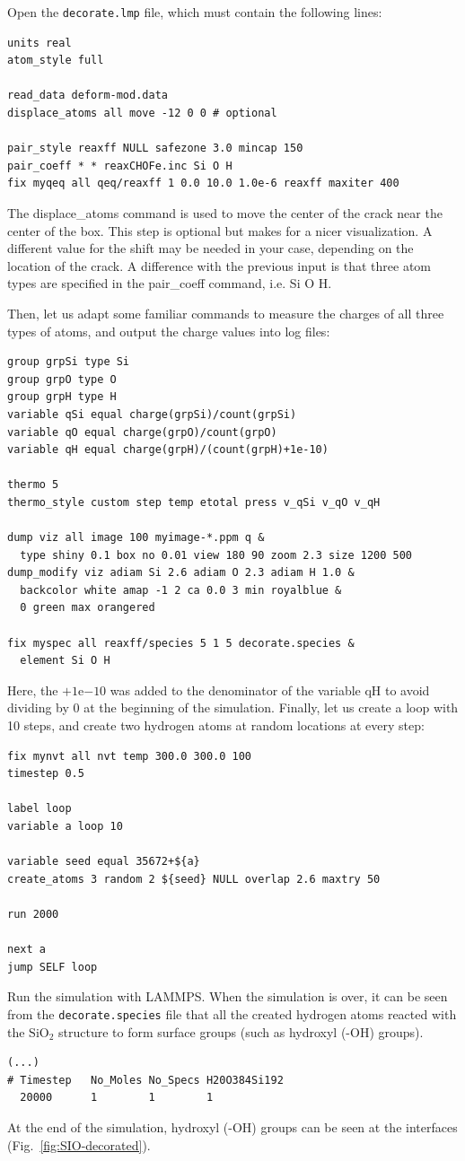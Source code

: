 \documentclass[9pt,tutorial]{livecoms}
\newcommand{\lmpcmd}[1]{\hspace{0pt}\colorbox{listing}{\textcolor{command}{\small{#1}}}\hspace{0pt}} %
\newcommand{\flecmd}[1]{\textcolor{command}{\texttt{#1}}} %
\begin{document}
Open the \flecmd{decorate.lmp} file, which must contain the following lines:
\begin{lstlisting}
units real
atom_style full

read_data deform-mod.data
displace_atoms all move -12 0 0 # optional

pair_style reaxff NULL safezone 3.0 mincap 150
pair_coeff * * reaxCHOFe.inc Si O H
fix myqeq all qeq/reaxff 1 0.0 10.0 1.0e-6 reaxff maxiter 400
\end{lstlisting}
The \lmpcmd{displace\_atoms} command is used to move the center of the
crack near the center of the box.  This step is optional but makes for a nicer
visualization.  A different value for the shift may be needed in
your case, depending on the location of the crack.  A difference with the previous
input is that three atom types are specified in the \lmpcmd{pair\_coeff} command, i.e.
\lmpcmd{Si O H}.

Then, let us adapt some familiar commands to measure the charges of all three
types of atoms, and output the charge values into log files:
\begin{lstlisting}
group grpSi type Si
group grpO type O
group grpH type H
variable qSi equal charge(grpSi)/count(grpSi)
variable qO equal charge(grpO)/count(grpO)
variable qH equal charge(grpH)/(count(grpH)+1e-10)

thermo 5
thermo_style custom step temp etotal press v_qSi v_qO v_qH

dump viz all image 100 myimage-*.ppm q &
  type shiny 0.1 box no 0.01 view 180 90 zoom 2.3 size 1200 500
dump_modify viz adiam Si 2.6 adiam O 2.3 adiam H 1.0 &
  backcolor white amap -1 2 ca 0.0 3 min royalblue &
  0 green max orangered

fix myspec all reaxff/species 5 1 5 decorate.species &
  element Si O H
\end{lstlisting}
Here, the $+1 \mathrm{e}{-10}$ was added to the denominator of the \lmpcmd{variable qH}
to avoid dividing by 0 at the beginning of the simulation.  Finally, let us
create a loop with 10 steps, and create two hydrogen atoms at random locations at
every step:
\begin{lstlisting}
fix mynvt all nvt temp 300.0 300.0 100
timestep 0.5

label loop
variable a loop 10

variable seed equal 35672+${a}
create_atoms 3 random 2 ${seed} NULL overlap 2.6 maxtry 50

run 2000

next a
jump SELF loop
\end{lstlisting}
Run the simulation with LAMMPS.  When the simulation is over,
it can be seen from the \flecmd{decorate.species} file that
all the created hydrogen atoms reacted with the $\text{SiO}_{2}$ structure to
form surface groups (such as hydroxyl (-OH) groups).
\begin{lstlisting}
(...)
# Timestep   No_Moles No_Specs H20O384Si192
  20000      1        1        1
\end{lstlisting}
At the end of the simulation, hydroxyl (-OH) groups can be seen at the interfaces
(Fig.~\ref{fig:SIO-decorated}).
\end{document}
